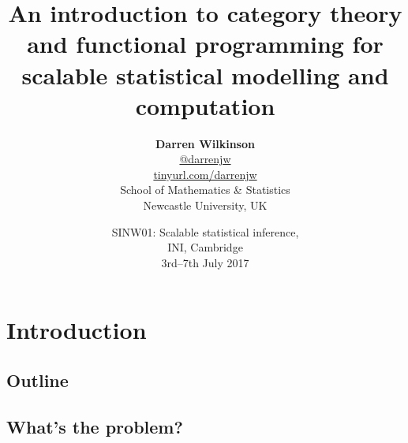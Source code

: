 \documentclass[mathserif,handout]{beamer}
\begin{document}
\title[CT and FP for scalable statistical computing]{An introduction to category theory and functional programming for scalable statistical modelling and computation}
\author[Darren Wilkinson --- INI, SINW01 4/7/17]{\textbf{\large Darren Wilkinson} \\
\url{@darrenjw}\\
\alert{\url{tinyurl.com/darrenjw}}\\
School of Mathematics \& Statistics\\Newcastle University, UK}
\date{SINW01: Scalable statistical inference,\\ INI, Cambridge\\3rd--7th July 2017}


\frame{\titlepage}

\section{Introduction}

\subsection{Outline}


\subsection{What's the problem?}
\end{document}
